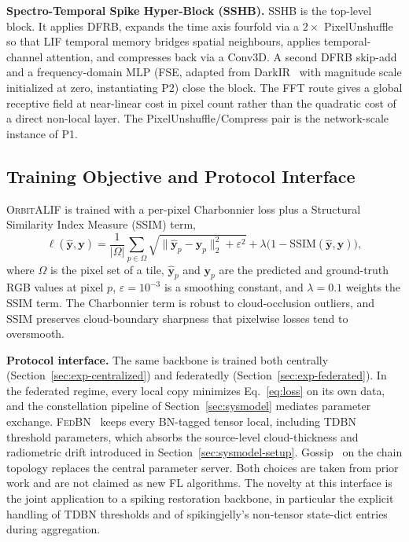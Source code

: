 \documentclass[conference]{IEEEtran}
\newcommand{\OrbitALIF}{\textsc{OrbitALIF}}
\newcommand{\DFRB}{\textsc{DFRB}}
\newcommand{\SSHB}{\textsc{SSHB}}
\begin{document}
\textbf{Spectro-Temporal Spike Hyper-Block (\SSHB{}).} \SSHB{} is
the top-level block. It applies \DFRB{}, expands the time axis
fourfold via a $2\!\times$ PixelUnshuffle so that LIF temporal
memory bridges spatial neighbours, applies temporal-channel
attention, and compresses back via a Conv3D. A second \DFRB{}
skip-add and a frequency-domain MLP (FSE, adapted from
DarkIR~\cite{ref:darkir2024} with magnitude scale initialized at
zero, instantiating P2) close the block. The FFT route gives a
global receptive field at near-linear cost in pixel count rather
than the quadratic cost of a direct non-local layer. The
PixelUnshuffle/Compress pair is the network-scale instance of P1.

\subsection{Training Objective and Protocol Interface}
\label{sec:framework-loss}

\OrbitALIF{} is trained with a per-pixel Charbonnier loss plus a
Structural Similarity Index Measure (SSIM) term,
\begin{equation}
\ell(\hat{\mathbf{y}},\mathbf{y})
=
\frac{1}{|\Omega|}\!\sum_{p\in\Omega}
\sqrt{\|\hat{\mathbf{y}}_p-\mathbf{y}_p\|_2^{2}+\varepsilon^2}
+\lambda\bigl(1-\mathrm{SSIM}(\hat{\mathbf{y}},\mathbf{y})\bigr),
\label{eq:loss}
\end{equation}
where $\Omega$ is the pixel set of a tile, $\hat{\mathbf{y}}_p$ and
$\mathbf{y}_p$ are the predicted and ground-truth RGB values at
pixel $p$, $\varepsilon\!=\!10^{-3}$ is a smoothing constant, and
$\lambda\!=\!0.1$ weights the SSIM term. The Charbonnier term is
robust to cloud-occlusion outliers, and SSIM preserves
cloud-boundary sharpness that pixelwise losses tend to oversmooth.

\textbf{Protocol interface.} The same backbone is trained both
centrally (Section~\ref{sec:exp-centralized}) and federatedly
(Section~\ref{sec:exp-federated}). In the federated regime, every
local copy minimizes Eq.~\eqref{eq:loss} on its own data, and the
constellation pipeline of Section~\ref{sec:sysmodel} mediates
parameter exchange. \textsc{FedBN}~\cite{ref:fedbn} keeps every
BN-tagged tensor local, including TDBN threshold parameters, which
absorbs the source-level cloud-thickness and radiometric drift
introduced in Section~\ref{sec:sysmodel-setup}.
Gossip~\cite{ref:gossip-boyd} on the chain topology replaces the
central parameter server. Both choices are taken from prior work
and are not claimed as new FL algorithms. The novelty at this
interface is the joint application to a spiking restoration
backbone, in particular the explicit handling of TDBN thresholds
and of spikingjelly's non-tensor state-dict entries during
aggregation.
\end{document}

